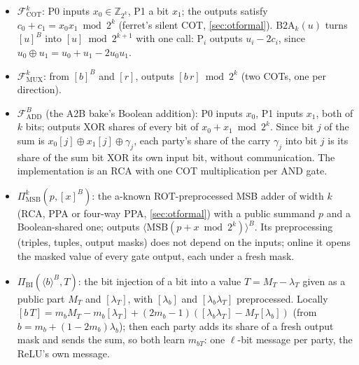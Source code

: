 \begin{itemize}\itemsep1pt
\item $\mathcal{F}^{k}_{\mathrm{COT}}$: P0 inputs $x_0 \in \mathbb{Z}_{2^k}$, P1 a bit $x_1$; the outputs satisfy
  $c_0 + c_1 = x_0 x_1 \bmod 2^k$ (ferret's silent COT, \cref{sec:otformal}). $\mathrm{B2A}_k(u)$ turns $[u]^B$ into
  $[u] \bmod 2^{k+1}$ with one call: P$_i$ outputs $u_i - 2 c_i$, since $u_0 \oplus u_1 = u_0 + u_1 - 2 u_0 u_1$.
\item $\mathcal{F}^{k}_{\mathrm{MUX}}$: from $[b]^B$ and $[r]$, outputs $[b\,r] \bmod 2^k$ (two COTs, one per
  direction).
\item $\mathcal{F}^{B}_{\mathrm{ADD}}$ (the A2B bake's Boolean addition): P0 inputs $x_0$, P1 inputs $x_1$, both of
  $k$ bits; outputs XOR shares of every bit of $x_0 + x_1 \bmod 2^k$. Since bit $j$ of the sum is
  $x_0[j] \oplus x_1[j] \oplus \gamma_j$, each party's share of the carry $\gamma_j$ into bit $j$ is its share of the
  sum bit XOR its own input bit, without communication. The implementation is an RCA with one COT multiplication per
  AND gate.
\item $\Pi^{k}_{\mathrm{MSB}}(p, [x]^B)$: the a-known ROT-preprocessed MSB adder of width $k$ (RCA, PPA or four-way PPA,
  \cref{sec:otformal}) with a public summand $p$ and a Boolean-shared one; outputs
  $\langle \mathrm{MSB}(p + x \bmod 2^k) \rangle^B$. Its preprocessing (triples, tuples, output masks) does not depend on
  the inputs; online it opens the masked value of every gate output, each under a fresh mask.
\item $\Pi_{\mathrm{BI}}(\langle b \rangle^B, T)$: the bit injection of a bit into a value $T = M_T - \lambda_T$ given as
  a public part $M_T$ and $[\lambda_T]$, with $[\lambda_b]$ and $[\lambda_b \lambda_T]$ preprocessed. Locally
  $[b\,T] = m_b M_T - m_b [\lambda_T] + (2 m_b - 1)([\lambda_b \lambda_T] - M_T [\lambda_b])$ (from
  $b = m_b + (1 - 2 m_b)\lambda_b$); then each party adds its share of a fresh output mask and sends the sum, so both
  learn $m_{bT}$: one $\ell$-bit message per party, the ReLU's own message.
\end{itemize}

